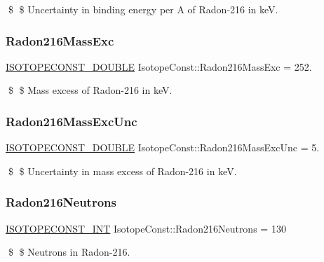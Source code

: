 \$ \$ Uncertainty in binding energy per A of Radon-\/216 in keV. \mbox{\label{group___isotope_const-_radon-_rn216_ga215877b59ae9ff12302bf2ebea09807e}} 
\subsubsection{\texorpdfstring{Radon216\+Mass\+Exc}{Radon216MassExc}}
{\footnotesize\ttfamily \mbox{\hyperlink{group___isotope_const-_macros_ga8f45a7272ce02c0b4c65c44636ed719a}{I\+S\+O\+T\+O\+P\+E\+C\+O\+N\+S\+T\+\_\+\+D\+O\+U\+B\+LE}} Isotope\+Const\+::\+Radon216\+Mass\+Exc = 252.}

\$ \$ Mass excess of Radon-\/216 in keV. \mbox{\label{group___isotope_const-_radon-_rn216_ga164bc0ce4b7c7e8c59627ed4c6fde1d7}} 
\subsubsection{\texorpdfstring{Radon216\+Mass\+Exc\+Unc}{Radon216MassExcUnc}}
{\footnotesize\ttfamily \mbox{\hyperlink{group___isotope_const-_macros_ga8f45a7272ce02c0b4c65c44636ed719a}{I\+S\+O\+T\+O\+P\+E\+C\+O\+N\+S\+T\+\_\+\+D\+O\+U\+B\+LE}} Isotope\+Const\+::\+Radon216\+Mass\+Exc\+Unc = 5.}

\$ \$ Uncertainty in mass excess of Radon-\/216 in keV. \mbox{\label{group___isotope_const-_radon-_rn216_ga102ebfa4725c1e51a25482670ae9537b}} 
\subsubsection{\texorpdfstring{Radon216\+Neutrons}{Radon216Neutrons}}
{\footnotesize\ttfamily \mbox{\hyperlink{group___isotope_const-_macros_ga5f18360b3e99483a35c32d789e62621c}{I\+S\+O\+T\+O\+P\+E\+C\+O\+N\+S\+T\+\_\+\+I\+NT}} Isotope\+Const\+::\+Radon216\+Neutrons = 130}

\$ \$ Neutrons in Radon-\/216. \mbox{\label{group___isotope_const-_radon-_rn216_ga8c5631d6c676358e18d76d8776f4b0ba}} 
